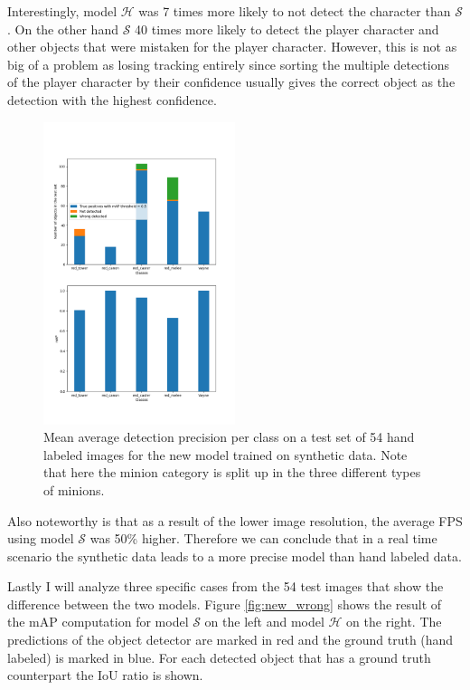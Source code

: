 Interestingly, model $\mathcal{H}$ was 7 times more likely to not detect the character than $\mathcal{S}$.
On the other hand $\mathcal{S}$ 40 times more likely to detect the player character and other objects that were mistaken for the player character.
However, this is not as big of a problem as losing tracking entirely since sorting the multiple detections of the player character by their confidence usually gives the correct object as the detection with the highest confidence.
\begin{figure}[H]
\includegraphics[width=0.5\textwidth]{figures/new_05_02_final.png}
\caption{Mean average detection precision per class on a test set of 54 hand labeled images for the new model trained on synthetic data. Note that here the minion category is split up in the three different types of minions.}
\label{fig:results_new}
\end{figure}
Also noteworthy is that as a result of the lower image resolution, the average FPS using model $\mathcal{S}$ was 50\% higher.
Therefore we can conclude that in a real time scenario the synthetic data leads to a more precise model than hand labeled data.

Lastly I will analyze three specific cases from the 54 test images that show the difference between the two models.
Figure \ref{fig:new_wrong} shows the result of the mAP computation for model $\mathcal{S}$ on the left and model $\mathcal{H}$ on the right.
The predictions of the object detector are marked in red and the ground truth (hand labeled) is marked in blue.
For each detected object that has a ground truth counterpart the IoU ratio is shown.

